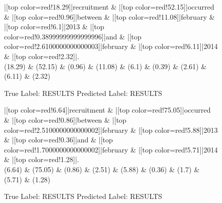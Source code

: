 \documentclass[a4paper, landscape]{article}
\begin{document}
\begin{figure}
\begin{center}
\begin{dependency}
\begin{deptext}
|[top color=red!18.29]|recruitment \& |[top color=red!52.15]|occurred \& |[top color=red!0.96]|between \& |[top color=red!11.08]|february \& |[top color=red!6.1]|2013 \& |[top color=red!0.38999999999999996]|and \& |[top color=red!2.6100000000000003]|february \& |[top color=red!6.11]|2014 \& |[top color=red!2.32]|.\\
(18.29) \& (52.15) \& (0.96) \& (11.08) \& (6.1) \& (0.39) \& (2.61) \& (6.11) \& (2.32)\\
\end{deptext}
\end{dependency}
\end{center}
\caption{True Label: RESULTS Predicted Label: RESULTS}
\end{figure}
\clearpage
\begin{figure}
\begin{center}
\begin{dependency}
\begin{deptext}
|[top color=red!6.64]|recruitment \& |[top color=red!75.05]|occurred \& |[top color=red!0.86]|between \& |[top color=red!2.5100000000000002]|february \& |[top color=red!5.88]|2013 \& |[top color=red!0.36]|and \& |[top color=red!1.7000000000000002]|february \& |[top color=red!5.71]|2014 \& |[top color=red!1.28]|.\\
(6.64) \& (75.05) \& (0.86) \& (2.51) \& (5.88) \& (0.36) \& (1.7) \& (5.71) \& (1.28)\\
\end{deptext}
\end{dependency}
\end{center}
\caption{True Label: RESULTS Predicted Label: RESULTS}
\end{figure}
\end{document}
